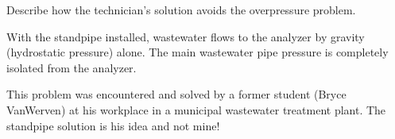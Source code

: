 Describe how the technician's solution avoids the overpressure problem.







With the standpipe installed, wastewater flows to the analyzer by gravity (hydrostatic pressure) alone.  The main wastewater pipe pressure is completely isolated from the analyzer.







This problem was encountered and solved by a former student (Bryce VanWerven) at his workplace in a municipal wastewater treatment plant.  The standpipe solution is his idea and not mine!




